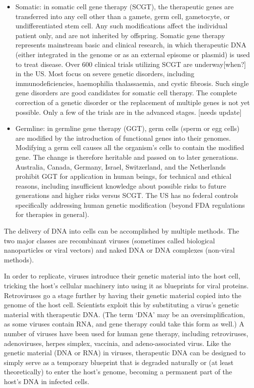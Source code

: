 \begin{itemize}
\item
  Somatic: in somatic cell gene therapy (SCGT), the therapeutic genes are transferred into any cell other than a gamete, germ cell, gametocyte, or undifferentiated stem cell. Any such modifications affect the individual patient only, and are not inherited by offspring. Somatic gene therapy represents mainstream basic and clinical research, in which therapeutic DNA (either integrated in the genome or as an external episome or plasmid) is used to treat disease. Over 600 clinical trials utilizing SCGT are underway{[}when?{]} in the US. Most focus on severe genetic disorders, including immunodeficiencies, haemophilia thalassaemia, and cystic fibrosis. Such single gene disorders are good candidates for somatic cell therapy. The complete correction of a genetic disorder or the replacement of multiple genes is not yet possible. Only a few of the trials are in the advanced stages. {[}needs update{]}
\item
  Germline: in germline gene therapy (GGT), germ cells (sperm or egg cells) are modified by the introduction of functional genes into their genomes. Modifying a germ cell causes all the organism's cells to contain the modified gene. The change is therefore heritable and passed on to later generations. Australia, Canada, Germany, Israel, Switzerland, and the Netherlands prohibit GGT for application in human beings, for technical and ethical reasons, including insufficient knowledge about possible risks to future generations and higher risks versus SCGT. The US has no federal controls specifically addressing human genetic modification (beyond FDA regulations for therapies in general).
\end{itemize}

The delivery of DNA into cells can be accomplished by multiple methods. The two major classes are recombinant viruses (sometimes called biological nanoparticles or viral vectors) and naked DNA or DNA complexes (non-viral methods).

In order to replicate, viruses introduce their genetic material into the host cell, tricking the host's cellular machinery into using it as blueprints for viral proteins. Retroviruses go a stage further by having their genetic material copied into the genome of the host cell. Scientists exploit this by substituting a virus's genetic material with therapeutic DNA. (The term `DNA' may be an oversimplification, as some viruses contain RNA, and gene therapy could take this form as well.) A number of viruses have been used for human gene therapy, including retroviruses, adenoviruses, herpes simplex, vaccinia, and adeno-associated virus. Like the genetic material (DNA or RNA) in viruses, therapeutic DNA can be designed to simply serve as a temporary blueprint that is degraded naturally or (at least theoretically) to enter the host's genome, becoming a permanent part of the host's DNA in infected cells.

